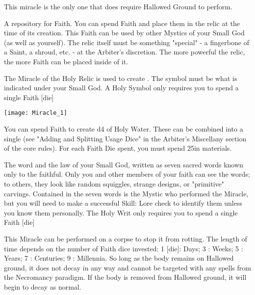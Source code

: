 This miracle is the only one that does  require Hallowed Ground to perform.


A repository for Faith.  You can spend \DICE Faith and place them in the relic at the time of its creation.  This Faith can be used by other Mystics of your Small God (as well as yourself).  The relic itself must be something "special" - a fingerbone of a Saint, a shroud, etc.  - at the Arbiter's discretion.  The more powerful the relic, the more Faith can be placed inside of it.

The Miracle of the Holy Relic is used to create .  The symbol must be what is indicated under your Small God.  A Holy Symbol only requires you to spend a single Faith [die]

  \begin{center}
  \texttt{[image: Miracle\_1]}
  \end{center}



You can spend \DICE Faith to create \DICE d4 \UD of Holy Water.  These \UD can be combined into a single \UD (see "Adding and Splitting Usage Dice" in the Arbiter's Miscellany section of the core rules). For each Faith Die spent, you must spend 25\AG in materials.


The word and the law of your Small God, written as seven sacred words known only to the faithful.  Only you and other members of your faith can see the words; to others, they look like random squiggles, strange designs, or "primitive" carvings.  Contained in the seven words is the Mystic who performed the Miracle, but you will need to make a successful Skill: Lore check to identify them unless you know them personally.   The Holy Writ only requires you to spend a single Faith [die]



This Miracle can be performed on a corpse to stop it from rotting.  The length of time depends on the number of Faith dice invested:  1 [die]: \SUMDICE Days; 3 \DICE: \SUMDICE Weeks; 5 \DICE: \SUMDICE Years; 7 \DICE: \SUMDICE Centuries; 9 \DICE: \SUMDICE Millennia.  So long as the body remains on Hallowed ground, it does not decay in any way and cannot be targeted with any spells from the Necromancy paradigm.  If the body is removed from Hallowed ground, it will begin to decay as normal.

